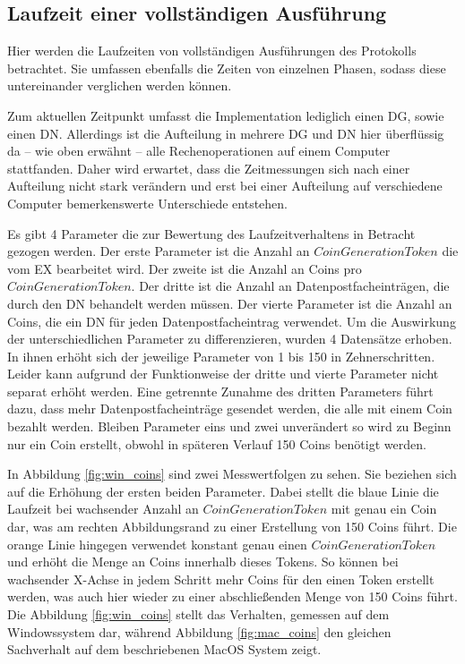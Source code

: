 \documentclass[
	fontsize=11pt,
	headings=small,
	parskip=half,           %
	bibliography=totoc,
	numbers=noenddot,       %
	open=any,               %
]{scrreprt}
\begin{document}
\subsection{Laufzeit einer vollständigen Ausführung}
\label{subsec:fullRuntime}
Hier werden die Laufzeiten von vollständigen Ausführungen des Protokolls betrachtet. Sie umfassen ebenfalls die Zeiten von einzelnen Phasen, sodass diese untereinander verglichen werden können.

Zum aktuellen Zeitpunkt umfasst die Implementation lediglich einen DG, sowie einen DN. Allerdings ist die Aufteilung in mehrere DG und DN hier überflüssig da -- wie oben erwähnt -- alle Rechenoperationen auf einem Computer stattfanden. Daher wird erwartet, dass die Zeitmessungen sich nach einer Aufteilung nicht stark verändern und erst bei einer Aufteilung auf verschiedene Computer bemerkenswerte Unterschiede entstehen.

Es gibt 4 Parameter die zur Bewertung des Laufzeitverhaltens in Betracht gezogen werden. Der erste Parameter ist die Anzahl an $CoinGenerationToken$ die vom EX bearbeitet wird. Der zweite ist die Anzahl an Coins pro $CoinGenerationToken$. Der dritte ist die Anzahl an Datenpostfacheinträgen, die durch den DN behandelt werden müssen. Der vierte Parameter ist die Anzahl an Coins, die ein DN für jeden Datenpostfacheintrag verwendet. Um die Auswirkung der unterschiedlichen Parameter zu differenzieren, wurden 4 Datensätze erhoben. In ihnen erhöht sich der jeweilige Parameter von 1 bis 150 in Zehnerschritten. Leider kann aufgrund der Funktionweise der dritte und vierte Parameter nicht separat erhöht werden. Eine getrennte Zunahme des dritten Parameters führt dazu, dass mehr Datenpostfacheinträge gesendet werden, die alle mit einem Coin bezahlt werden. Bleiben Parameter eins und zwei unverändert so wird zu Beginn nur ein Coin erstellt, obwohl in späteren Verlauf 150 Coins benötigt werden.

In Abbildung \ref{fig:win_coins} sind zwei Messwertfolgen zu sehen. Sie beziehen sich auf die Erhöhung der ersten beiden Parameter. Dabei stellt die blaue Linie die Laufzeit bei wachsender Anzahl an $CoinGenerationToken$ mit genau ein Coin dar, was am rechten Abbildungsrand zu einer Erstellung von 150 Coins führt. Die orange Linie hingegen verwendet konstant genau einen $CoinGenerationToken$ und erhöht die Menge an Coins innerhalb dieses Tokens. So können bei wachsender X-Achse in jedem Schritt mehr Coins für den einen Token erstellt werden, was auch hier wieder zu einer abschließenden Menge von 150 Coins führt. Die Abbildung \ref{fig:win_coins} stellt das Verhalten, gemessen auf dem Windowssystem dar, während Abbildung \ref{fig:mac_coins} den gleichen Sachverhalt auf dem beschriebenen MacOS System zeigt.
\end{document}
